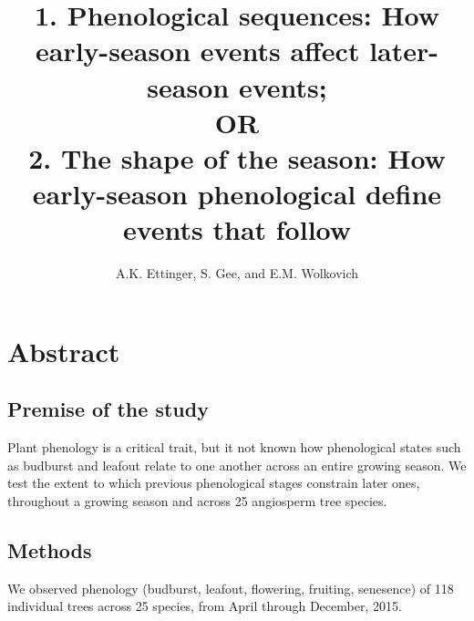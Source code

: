 \documentclass{article}
\begin{document}

\title{1. Phenological sequences: How early-season events affect later-season events; \\ OR \\
2. The shape of the season: How early-season phenological define events that follow}
\author{A.K. Ettinger, S. Gee, and E.M. Wolkovich}
\maketitle  %



\section*{Abstract}
\subsection*{Premise of the study}
Plant phenology is a critical trait, but it not known how phenological states such as budburst and leafout relate to one another across an entire growing season. We test the extent to which previous phenological stages constrain later ones, throughout a growing season and across 25 angiosperm tree species. 
\subsection*{Methods}
We observed phenology (budburst, leafout, flowering, fruiting, senesence) of 118 individual trees across 25 species, from April through December, 2015. 
\end{document}
